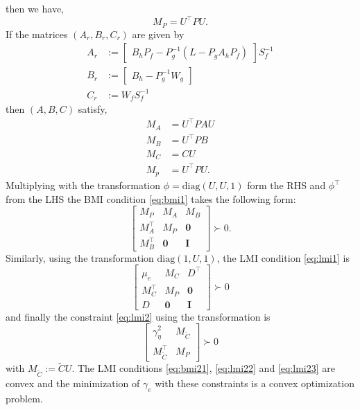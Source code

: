 \documentclass[a4paper]{article}
\begin{document}
then we have, 
\begin{equation}
	M_{P} = U^{\top} {P} U.
\end{equation}
If the matrices $(A_{r}, B_{r}, C_{r})$ are given by 
\begin{equation}
	\begin{aligned}
		A_{r} &:= \begin{bmatrix}
			B_{h} P_{f} - P_{g}^{-1}(L - P_g A_h P_f)
		\end{bmatrix} S_{f}^{-1} \\
		B_{r} &:= \begin{bmatrix}
			B_{h} - P_g^{-1}W_{g}
		\end{bmatrix}\\
		C_{r} &:= W_{f}S_{f}^{-1}
	\end{aligned}
\end{equation}
then $(A, B, C)$ satisfy, 
\begin{align}
	M_{A} &= U^{\top}P A U \\
	M_{B} &= U^{\top}P B\\
	M_{C} &=  C U \\
	M_{p} &= U^{\top}PU.
\end{align}
Multiplying with the transformation $\phi = \textrm{diag}(U, U, 1)$ form the RHS and $\phi^{\top}$  from the LHS the BMI condition \ref{eq:bmi1} takes the following form:
\begin{equation}
	\begin{bmatrix}
		M_{P} & M_{A} & M_{B}\\
		M_{A}^{\top} & M_{P} & \mathbf{0} \\
		M_{B}^{\top} & \mathbf{0} & \mathbf{I}
	\end{bmatrix} \succ 0.
	\label{eq:bmi21}
\end{equation}
Similarly, using the transformation $\textrm{diag}(1, U, 1)$, the LMI condition \ref{eq:lmi1} is 
\begin{equation}
	\begin{bmatrix}	
	\mu_{e} & M_{C} & D^{\top} \\
	M_{C}^{\top} & M_{P} & \mathbf{0} \\
	D & \mathbf{0} & \mathbf{I}
	\end{bmatrix} \succ 0
	\label{eq:lmi22}
\end{equation}
and finally the constraint \ref{eq:lmi2} using the transformation is 
\begin{equation}
	\begin{bmatrix}
		\gamma_{\eta}^{2} & M_{\tilde{C}} \\
		M_{\tilde{C}}^{\top} & M_{P}
	\end{bmatrix} \succ 0 \label{eq:lmi23}
\end{equation}
with $M_{\tilde{C}} := \tilde{C}U$. The LMI conditions  \ref{eq:bmi21}, \ref{eq:lmi22} and \ref{eq:lmi23} are convex and the minimization of $\gamma_{e}$ with these constraints is a convex optimization problem. 
\newpage

 
\end{document}
